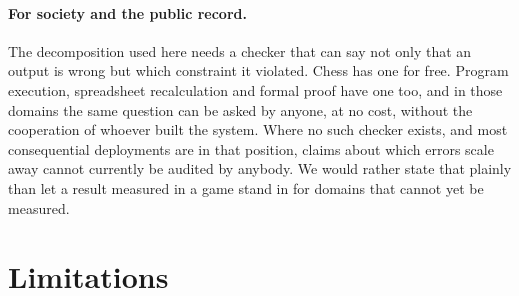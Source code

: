 \documentclass[11pt]{article}
\begin{document}
\paragraph{For society and the public record.}
The decomposition used here needs a checker that can say not only that an output is
wrong but which constraint it violated. Chess has one for free. Program execution,
spreadsheet recalculation and formal proof have one too, and in those domains the
same question can be asked by anyone, at no cost, without the cooperation of whoever
built the system. Where no such checker exists, and most consequential deployments
are in that position, claims about which errors scale away cannot currently be
audited by anybody. We would rather state that plainly than let a result measured in
a game stand in for domains that cannot yet be measured.
\section{Limitations}
\label{sec:limits}
\end{document}
